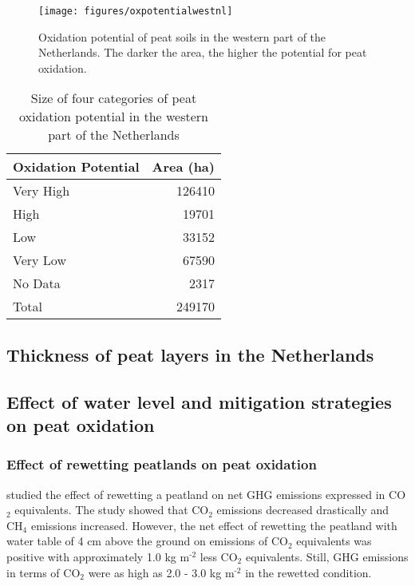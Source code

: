 \documentclass[12pt,a4paper,titlepage]{article}
\newcommand{\sur}[1]{\ensuremath{^{\textrm{#1}}}}
\newcommand{\sous}[1]{\ensuremath{_{\textrm{#1}}}}
\begin{document}
\begin{figure}
    \centering
    \texttt{[image: figures/oxpotentialwestnl]} 
    \caption{Oxidation potential of peat soils in the western part of the Netherlands. The darker the area, the higher the potential for peat oxidation.}
    \label{fig:oxpotwestnl}
\end{figure}

\begin{table}[htbp]
\caption{Size of four categories of peat oxidation potential in the western part of the Netherlands}
\begin{center}
\begin{tabular}{|l|r|}
\hline
\textbf{Oxidation Potential} & \multicolumn{1}{l|}{\textbf{Area (ha)}} \\ \hline
Very High & 126410 \\ \hline
High & 19701 \\ \hline
Low & 33152 \\ \hline
Very Low & 67590 \\ \hline
No Data & 2317 \\ \hline
Total & 249170 \\ \hline
\end{tabular}
\end{center}
\label{tab:oxpotareacalcwestnl}
\end{table}



\subsection{Thickness of peat layers in the Netherlands}

\subsection{Effect of water level and mitigation strategies on peat oxidation}

\subsubsection{Effect of rewetting peatlands on peat oxidation}

\citet{van2013rewetting} studied the effect of rewetting a peatland on net GHG emissions expressed in CO\sous{2} equivalents. The study showed that CO\sous{2} emissions decreased drastically and CH\sous{4} emissions increased. However, the net effect of rewetting the peatland with water table of 4 cm above the ground on emissions of CO\sous{2} equivalents was positive with approximately 1.0 kg m\sur{-2} less CO\sous{2} equivalents. Still, GHG emissions in terms of CO\sous{2} were as high as 2.0 - 3.0 kg m\sur{-2} in the rewetted condition. 
\end{document}
